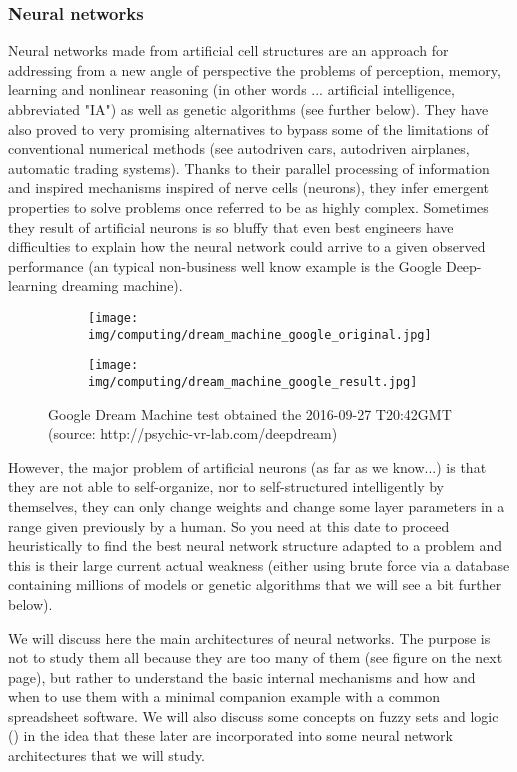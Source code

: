 	\subsubsection{Neural networks}\label{neural network}
	Neural networks made from artificial cell structures are an approach for addressing from a new angle of perspective the problems of perception, memory, learning and nonlinear reasoning (in other words ... artificial intelligence, abbreviated "IA") as well as genetic algorithms (see further below). They have also proved to very promising alternatives to bypass some of the limitations of conventional numerical methods (see autodriven cars, autodriven airplanes, automatic trading systems). Thanks to their parallel processing of information and inspired mechanisms inspired of nerve cells (neurons), they infer emergent properties to solve problems once referred to be as highly complex. Sometimes they result of artificial neurons is so bluffy that even best engineers have difficulties to explain how the neural network could arrive to a given observed performance (an typical non-business well know example is the Google Deep-learning dreaming machine).
	\begin{figure}[H]
		\centering
		\begin{subfigure}{.5\textwidth}
		  \centering
		  \texttt{[image: img/computing/dream\_machine\_google\_original.jpg]}
		\end{subfigure}%
		\begin{subfigure}{.5\textwidth}
		  \centering
		  \texttt{[image: img/computing/dream\_machine\_google\_result.jpg]}
		\end{subfigure}
		\caption[Google Dream Machine test]{Google Dream Machine test obtained the 2016-09-27 T20:42GMT (source: http://psychic-vr-lab.com/deepdream)}
	\end{figure}

	However, the major problem of artificial neurons (as far as we know...) is that they are not able to self-organize, nor to self-structured intelligently by themselves, they can only change weights and change some layer parameters in a range given previously by a human. So you need at this date to proceed heuristically to find the best neural network structure adapted to a problem and this is their large current actual weakness (either using brute force via a database containing millions of models or genetic algorithms that we will see a bit further below).
	
	We will discuss here the main architectures of neural networks. The purpose is not to study them all because they are too many of them (see figure on the next page), but rather to understand the basic internal mechanisms and how and when to use them with a minimal companion example with a common spreadsheet software. We will also discuss some concepts on fuzzy sets and logic () in the idea that these later are incorporated into some neural network architectures that we will study.
	
